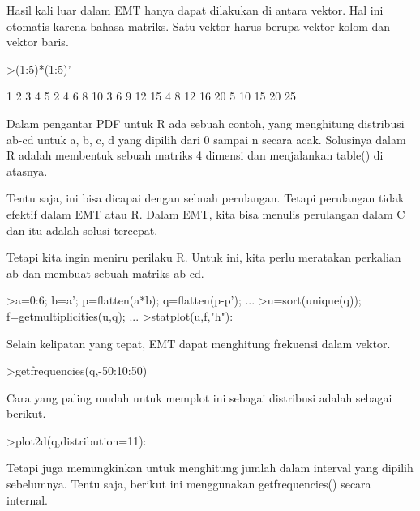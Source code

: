 \documentclass[a4paper,10pt]{article}
\begin{document}
\begin{eulernotebook}
\begin{eulercomment}
\begin{eulercomment}
\begin{eulercomment}
\begin{eulercomment}
\begin{eulercomment}
Hasil kali luar dalam EMT hanya dapat dilakukan di antara vektor. Hal
ini otomatis karena bahasa matriks. Satu vektor harus berupa vektor
kolom dan vektor baris.
\end{eulercomment}
\begin{eulerprompt}
>(1:5)*(1:5)'
\end{eulerprompt}
\begin{euleroutput}
          1         2         3         4         5 
          2         4         6         8        10 
          3         6         9        12        15 
          4         8        12        16        20 
          5        10        15        20        25 
\end{euleroutput}
\begin{eulercomment}
Dalam pengantar PDF untuk R ada sebuah contoh, yang menghitung
distribusi ab-cd untuk a, b, c, d yang dipilih dari 0 sampai n secara
acak. Solusinya dalam R adalah membentuk sebuah matriks 4 dimensi dan
menjalankan table() di atasnya.

Tentu saja, ini bisa dicapai dengan sebuah perulangan. Tetapi
perulangan tidak efektif dalam EMT atau R. Dalam EMT, kita bisa
menulis perulangan dalam C dan itu adalah solusi tercepat.

Tetapi kita ingin meniru perilaku R. Untuk ini, kita perlu meratakan
perkalian ab dan membuat sebuah matriks ab-cd.
\end{eulercomment}
\begin{eulerprompt}
>a=0:6; b=a'; p=flatten(a*b); q=flatten(p-p'); ...
>u=sort(unique(q)); f=getmultiplicities(u,q); ...
>statplot(u,f,"h"):
\end{eulerprompt}
\begin{eulercomment}
Selain kelipatan yang tepat, EMT dapat menghitung frekuensi dalam
vektor.
\end{eulercomment}
\begin{eulerprompt}
>getfrequencies(q,-50:10:50)
\end{eulerprompt}
\begin{euleroutput}
  [0,  23,  132,  316,  602,  801,  333,  141,  53,  0]
\end{euleroutput}
\begin{eulercomment}
Cara yang paling mudah untuk memplot ini sebagai distribusi adalah
sebagai berikut.
\end{eulercomment}
\begin{eulerprompt}
>plot2d(q,distribution=11):
\end{eulerprompt}
\begin{eulercomment}
Tetapi juga memungkinkan untuk menghitung jumlah dalam interval yang
dipilih sebelumnya. Tentu saja, berikut ini menggunakan
getfrequencies() secara internal.


\end{eulercomment}
\end{eulercomment}
\end{eulercomment}
\end{eulercomment}
\end{eulercomment}
\end{eulernotebook}
\end{document}
